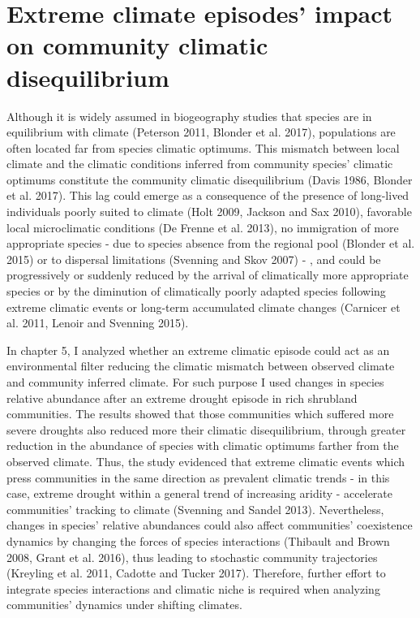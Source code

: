 \documentclass[11pt,twoside]{reedthesis}
\begin{document}
\section{Extreme climate episodes' impact on community climatic
disequilibrium}\label{extreme-climate-episodes-impact-on-community-climatic-disequilibrium}

Although it is widely assumed in biogeography studies that species are
in equilibrium with climate (Peterson 2011, Blonder et al. 2017),
populations are often located far from species climatic optimums. This
mismatch between local climate and the climatic conditions inferred from
community species' climatic optimums constitute the community climatic
disequilibrium (Davis 1986, Blonder et al. 2017). This lag could emerge
as a consequence of the presence of long-lived individuals poorly suited
to climate (Holt 2009, Jackson and Sax 2010), favorable local
microclimatic conditions (De Frenne et al. 2013), no immigration of more
appropriate species - due to species absence from the regional pool
(Blonder et al. 2015) or to dispersal limitations (Svenning and Skov
2007) - , and could be progressively or suddenly reduced by the arrival
of climatically more appropriate species or by the diminution of
climatically poorly adapted species following extreme climatic events or
long-term accumulated climate changes (Carnicer et al. 2011, Lenoir and
Svenning 2015). \par

In chapter 5, I analyzed whether an extreme climatic episode could act
as an environmental filter reducing the climatic mismatch between
observed climate and community inferred climate. For such purpose I used
changes in species relative abundance after an extreme drought episode
in rich shrubland communities. The results showed that those communities
which suffered more severe droughts also reduced more their climatic
disequilibrium, through greater reduction in the abundance of species
with climatic optimums farther from the observed climate. Thus, the
study evidenced that extreme climatic events which press communities in
the same direction as prevalent climatic trends - in this case, extreme
drought within a general trend of increasing aridity - accelerate
communities' tracking to climate (Svenning and Sandel 2013).
Nevertheless, changes in species' relative abundances could also affect
communities' coexistence dynamics by changing the forces of species
interactions (Thibault and Brown 2008, Grant et al. 2016), thus leading
to stochastic community trajectories (Kreyling et al. 2011, Cadotte and
Tucker 2017). Therefore, further effort to integrate species
interactions and climatic niche is required when analyzing communities'
dynamics under shifting climates.\par
\end{document}
